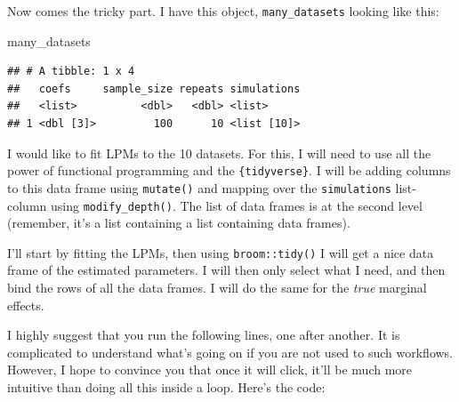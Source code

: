 \documentclass[
]{article}
\newenvironment{Shaded}{\begin{snugshade}}{\end{snugshade}}
\newcommand{\NormalTok}[1]{#1}
\begin{document}
Now comes the tricky part. I have this object, \texttt{many\_datasets} looking like this:

\begin{Shaded}
\begin{Highlighting}[]
\NormalTok{many\_datasets}
\end{Highlighting}
\end{Shaded}

\begin{verbatim}
## # A tibble: 1 x 4
##   coefs     sample_size repeats simulations
##   <list>          <dbl>   <dbl> <list>     
## 1 <dbl [3]>         100      10 <list [10]>
\end{verbatim}

I would like to fit LPMs to the 10 datasets. For this, I will need to use all the power of functional
programming and the \texttt{\{tidyverse\}}. I will be adding columns to this data frame using \texttt{mutate()}
and mapping over the \texttt{simulations} list-column using \texttt{modify\_depth()}. The list of data frames is
at the second level (remember, it's a list containing a list containing data frames).

I'll start by fitting the LPMs, then using \texttt{broom::tidy()} I will get a nice data frame of the
estimated parameters. I will then only select what I need, and then bind the rows of all the
data frames. I will do the same for the \emph{true} marginal effects.

I highly suggest that you run the following lines, one after another. It is complicated to understand
what's going on if you are not used to such workflows. However, I hope to convince you that once
it will click, it'll be much more intuitive than doing all this inside a loop. Here's the code:
\end{document}
